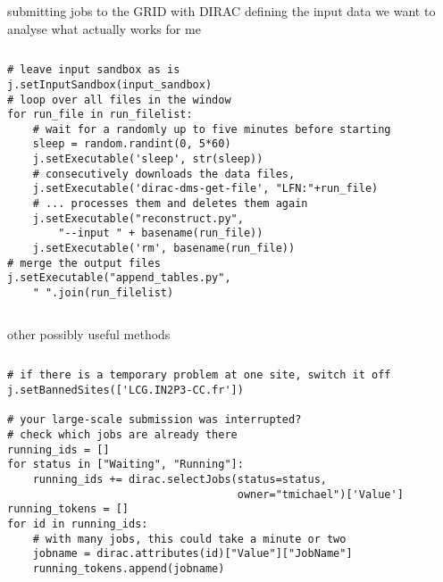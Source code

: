 \documentclass{beamer}
\begin{document}
\begin{frame}[fragile]{submitting jobs to the GRID with DIRAC}
                      {defining the input data we want to analyse}
    what actually works for me
    \begin{columns}
        \begin{lstlisting}[basicstyle=\scriptsize,firstnumber=38]
# leave input sandbox as is
j.setInputSandbox(input_sandbox)
# loop over all files in the window
for run_file in run_filelist:
    # wait for a randomly up to five minutes before starting
    sleep = random.randint(0, 5*60)
    j.setExecutable('sleep', str(sleep))
    # consecutively downloads the data files,
    j.setExecutable('dirac-dms-get-file', "LFN:"+run_file)
    # ... processes them and deletes them again
    j.setExecutable("reconstruct.py",
        "--input " + basename(run_file))
    j.setExecutable('rm', basename(run_file))
# merge the output files
j.setExecutable("append_tables.py",
    " ".join(run_filelist)
        \end{lstlisting}
    \end{columns}
\end{frame}



\begin{frame}[fragile]{other possibly useful methods}
    \begin{columns}
        \begin{lstlisting}[basicstyle=\scriptsize,numbers=none]
# if there is a temporary problem at one site, switch it off
j.setBannedSites(['LCG.IN2P3-CC.fr'])

# your large-scale submission was interrupted?
# check which jobs are already there
running_ids = []
for status in ["Waiting", "Running"]:
    running_ids += dirac.selectJobs(status=status,
                                    owner="tmichael")['Value']
running_tokens = []
for id in running_ids:
    # with many jobs, this could take a minute or two
    jobname = dirac.attributes(id)["Value"]["JobName"]
    running_tokens.append(jobname)



        \end{lstlisting}
    \end{columns}
\end{frame}
\end{document}
